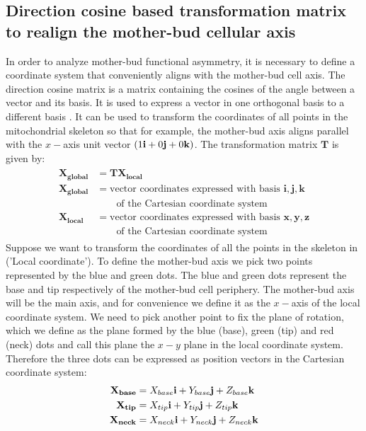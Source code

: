 \subsection{Direction cosine based transformation matrix to realign the mother-bud cellular axis}
In order to analyze mother-bud functional asymmetry, it is necessary to define a coordinate system that conveniently aligns with the mother-bud cell axis. 
The direction cosine matrix is a matrix containing the cosines of the angle between a vector and its basis. It is used to express a vector in one orthogonal basis to a different basis \cite{kane_spacecraft_1983}. It can be used to transform the coordinates of all points in the mitochondrial skeleton so that for example, the mother-bud axis aligns parallel with the $x-$axis unit vector $(1\mathbf{i}+0\mathbf{j}+0\mathbf{k})$. The transformation matrix $\mathbf{T}$ is given by:
\begin{equation}
	\begin{split}
		\begin{aligned}
			\mathbf{X_{global}} &= \mathbf{T X_{local}} \\
			\mathbf{X_{global}} &= \text{vector coordinates expressed with basis } \mathbf{i,j,k} \\[-1.5ex]
			&\qquad\text{of the Cartesian coordinate system} \\
			\mathbf{X_{local}} &= \text{vector coordinates expressed with basis } \mathbf{x,y,z} \\[-1.5ex]
			&\qquad\text{of the Cartesian coordinate system} 
		\end{aligned}
	\end{split}
\end{equation}
Suppose we want to transform the coordinates of all the points in the skeleton in  ('Local coordinate'). To define the mother-bud axis we pick two points represented by the blue and green dots. The blue and green dots represent the base and tip respectively of the mother-bud cell periphery. The mother-bud axis will be the main axis, and for convenience we define it as the $x-$axis of the local coordinate system. We need to pick another point to fix the plane of rotation, which we define as the plane formed by the blue (base), green (tip) and red (neck) dots and call this plane the $x-y$ plane in the local coordinate system. Therefore the three dots can be expressed as position vectors in the Cartesian coordinate system:
\begin{equation}
\begin{split}
		\begin{aligned}
		   \mathbf{X_{base}}&=X_{base}\mathbf{i}+Y_{base}\mathbf{j}+Z_{base}\mathbf{k}\\
		   \mathbf{X_{tip}}&=X_{tip}\mathbf{i}+Y_{tip}\mathbf{j}+Z_{tip}\mathbf{k}\\
		   \mathbf{X_{neck}}&=X_{neck}\mathbf{i}+Y_{neck}\mathbf{j}+Z_{neck}\mathbf{k}\\
		\end{aligned}
	\end{split}
\end{equation}
